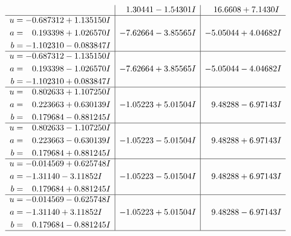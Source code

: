 \documentclass[1p]{elsarticle_modified}
\theoremstyle{definition}
\begin{document}
$$\begin{array}{c|c|c}
 & \phantom{-}1.30441 - 1.54301 I & \phantom{-}16.6608 + 7.1430 I \\ \hline\begin{aligned}
u &= -0.687312 + 1.135150 I \\
a &= \phantom{-}0.193398 + 1.026570 I \\
b &= -1.102310 - 0.083847 I\end{aligned}
 & -7.62664 - 3.85565 I & -5.05044 + 4.04682 I \\ \hline\begin{aligned}
u &= -0.687312 - 1.135150 I \\
a &= \phantom{-}0.193398 - 1.026570 I \\
b &= -1.102310 + 0.083847 I\end{aligned}
 & -7.62664 + 3.85565 I & -5.05044 - 4.04682 I \\ \hline\begin{aligned}
u &= \phantom{-}0.802633 + 1.107250 I \\
a &= \phantom{-}0.223663 + 0.630139 I \\
b &= \phantom{-}0.179684 - 0.881245 I\end{aligned}
 & -1.05223 + 5.01504 I & \phantom{-}9.48288 - 6.97143 I \\ \hline\begin{aligned}
u &= \phantom{-}0.802633 - 1.107250 I \\
a &= \phantom{-}0.223663 - 0.630139 I \\
b &= \phantom{-}0.179684 + 0.881245 I\end{aligned}
 & -1.05223 - 5.01504 I & \phantom{-}9.48288 + 6.97143 I \\ \hline\begin{aligned}
u &= -0.014569 + 0.625748 I \\
a &= -1.31140 - 3.11852 I \\
b &= \phantom{-}0.179684 + 0.881245 I\end{aligned}
 & -1.05223 - 5.01504 I & \phantom{-}9.48288 + 6.97143 I \\ \hline\begin{aligned}
u &= -0.014569 - 0.625748 I \\
a &= -1.31140 + 3.11852 I \\
b &= \phantom{-}0.179684 - 0.881245 I\end{aligned}
 & -1.05223 + 5.01504 I & \phantom{-}9.48288 - 6.97143 I\\
 \hline 
 \end{array}$$\newpage
\newpage\renewcommand{\arraystretch}{1}
\end{document}
